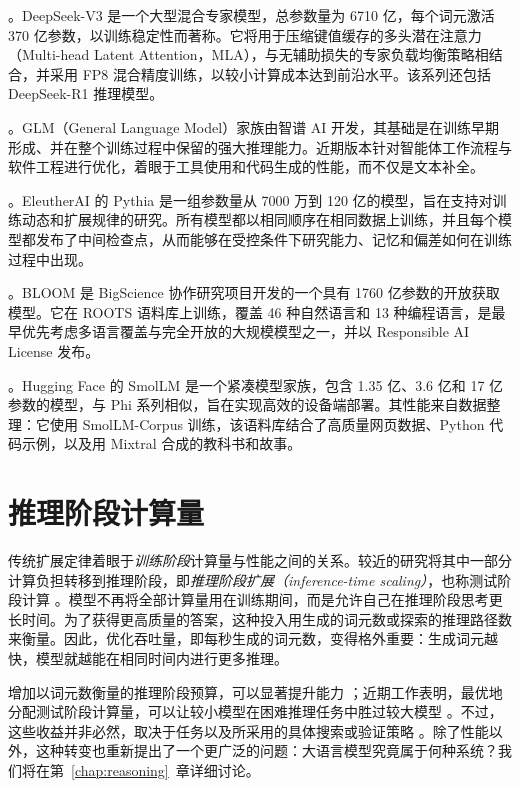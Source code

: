 \begin{description}[font=\bfseries]
    \item[DeepSeek] \citep{deepseekai2025deepseekv3technicalreport}。DeepSeek-V3 是一个大型混合专家模型，总参数量为 6710 亿，每个词元激活 370 亿参数，以训练稳定性而著称。它将用于压缩键值缓存的多头潜在注意力（Multi-head Latent Attention，MLA），与无辅助损失的专家负载均衡策略相结合，并采用 FP8 混合精度训练，以较小计算成本达到前沿水平。该系列还包括 DeepSeek-R1 推理模型。
    \item[GLM] \citep{glm5team2026glm5vibecodingagentic}。GLM（General Language Model）家族由智谱 AI 开发，其基础是在训练早期形成、并在整个训练过程中保留的强大推理能力。近期版本针对智能体工作流程与软件工程进行优化，着眼于工具使用和代码生成的性能，而不仅是文本补全。
    \item[Pythia] \citep{biderman2023pythia}。EleutherAI 的 Pythia 是一组参数量从 7000 万到 120 亿的模型，旨在支持对训练动态和扩展规律的研究。所有模型都以相同顺序在相同数据上训练，并且每个模型都发布了中间检查点，从而能够在受控条件下研究能力、记忆和偏差如何在训练过程中出现。
    \item[BLOOM] \citep{workshop2023bloom176bparameteropenaccessmultilingual}。BLOOM 是 BigScience 协作研究项目开发的一个具有 1760 亿参数的开放获取模型。它在 ROOTS 语料库上训练，覆盖 46 种自然语言和 13 种编程语言，是最早优先考虑多语言覆盖与完全开放的大规模模型之一，并以 Responsible AI License 发布。
    \item[SmolLM] \citep{allal2025smollm}。Hugging Face 的 SmolLM 是一个紧凑模型家族，包含 1.35 亿、3.6 亿和 17 亿参数的模型，与 Phi 系列相似，旨在实现高效的设备端部署。其性能来自数据整理：它使用 SmolLM-Corpus 训练，该语料库结合了高质量网页数据、Python 代码示例，以及用 Mixtral 合成的教科书和故事。
\end{description}

\section{推理阶段计算量}
\label{sec:inference-time}

传统扩展定律着眼于\textit{训练阶段}计算量与性能之间的关系。较近的研究将其中一部分计算负担转移到推理阶段，即\emph{推理阶段扩展（inference-time scaling）}，也称测试阶段计算 \citep{muennighoff2025s1}。模型不再将全部计算量用在训练期间，而是允许自己在推理阶段思考更长时间。为了获得更高质量的答案，这种投入用生成的词元数或探索的推理路径数来衡量。因此，优化吞吐量，即每秒生成的词元数，变得格外重要：生成词元越快，模型就越能在相同时间内进行更多推理。

增加以词元数衡量的推理阶段预算，可以显著提升能力 \citep{du2024debate}；近期工作表明，最优地分配测试阶段计算量，可以让较小模型在困难推理任务中胜过较大模型 \citep{snell2024scaling}。不过，这些收益并非必然，取决于任务以及所采用的具体搜索或验证策略 \citep{stechly2023gpt}。除了性能以外，这种转变也重新提出了一个更广泛的问题：大语言模型究竟属于何种系统？我们将在第~\ref{chap:reasoning}~章详细讨论。

